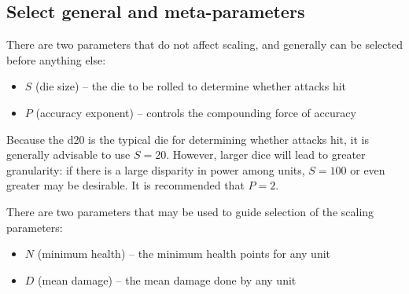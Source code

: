 \subsection{Select general and meta-parameters}

There are two parameters that do not affect scaling,
and generally can be selected before anything else:

\begin{itemize}
    \item $S$ (die size) -- the die to be rolled to determine whether attacks hit
    \item $P$ (accuracy exponent) -- controls the compounding force of accuracy
\end{itemize}

Because the d20 is the typical die for determining whether attacks hit,
it is generally advisable to use $S = 20$.
However, larger dice will lead to greater granularity:
if there is a large disparity in power among units,
$S = 100$ or even greater may be desirable.
It is recommended that $P = 2$.

There are two parameters that may be used to guide selection of the scaling parameters:

\begin{itemize}
    \item $N$ (minimum health) -- the minimum health points for any unit
    \item $D$ (mean damage) -- the mean damage done by any unit
\end{itemize}

